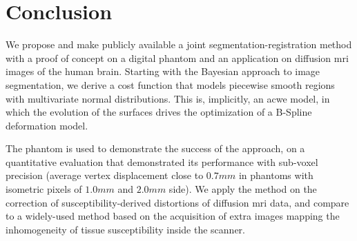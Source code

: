 \section{Conclusion}
\label{sec:conclusion}
%
We propose and make publicly available a joint
  segmentation-registration method with a proof of concept
  on a digital phantom and an application on diffusion \gls*{mri}
  images of the human brain.
Starting with the Bayesian approach to image segmentation, we derive
  a cost function that models piecewise smooth regions with
  multivariate normal distributions.
This is, implicitly, an \acrlong*{acwe} model, in which the
  evolution of the surfaces drives the optimization of a B-Spline
  deformation model.

The phantom is used to demonstrate the success of the approach,
  on a quantitative evaluation that demonstrated its performance
  with sub-voxel precision (average vertex displacement close to
  $0.7mm$ in phantoms with isometric pixels of $1.0mm$ and $2.0mm$
  side).
We apply the method on the correction of susceptibility-derived
  distortions of diffusion \gls*{mri} data, and compare to
  a widely-used method based on the acquisition of extra images
  mapping the inhomogeneity of tissue susceptibility inside
  the scanner.